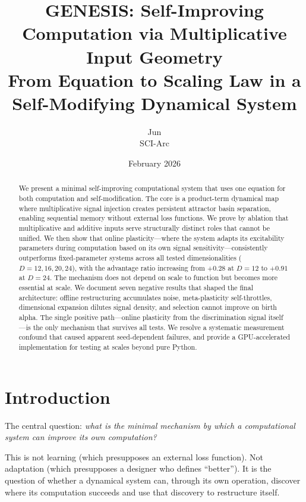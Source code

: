 \documentclass[11pt,a4paper]{article}
\title{\textbf{GENESIS: Self-Improving Computation via Multiplicative Input Geometry}\\[6pt]
\large From Equation to Scaling Law in a Self-Modifying Dynamical System}
\author{Jun \\ SCI-Arc}
\date{February 2026}
\begin{document}
\maketitle

\begin{abstract}
We present a minimal self-improving computational system that uses one equation for both computation and self-modification. The core is a product-term dynamical map where multiplicative signal injection creates persistent attractor basin separation, enabling sequential memory without external loss functions. We prove by ablation that multiplicative and additive inputs serve structurally distinct roles that cannot be unified. We then show that online plasticity---where the system adapts its excitability parameters during computation based on its own signal sensitivity---consistently outperforms fixed-parameter systems across all tested dimensionalities ($D{=}12,16,20,24$), with the advantage ratio increasing from $+0.28$ at $D{=}12$ to $+0.91$ at $D{=}24$. The mechanism does not depend on scale to function but becomes more essential at scale. We document seven negative results that shaped the final architecture: offline restructuring accumulates noise, meta-plasticity self-throttles, dimensional expansion dilutes signal density, and selection cannot improve on birth alpha. The single positive path---online plasticity from the discrimination signal itself---is the only mechanism that survives all tests. We resolve a systematic measurement confound that caused apparent seed-dependent failures, and provide a GPU-accelerated implementation for testing at scales beyond pure Python.
\end{abstract}

\tableofcontents
\newpage

\section{Introduction}
\label{sec:intro}

The central question: \emph{what is the minimal mechanism by which a computational system can improve its own computation?}

This is not learning (which presupposes an external loss function). Not adaptation (which presupposes a designer who defines ``better''). It is the question of whether a dynamical system can, through its own operation, discover where its computation succeeds and use that discovery to restructure itself.
\end{document}
